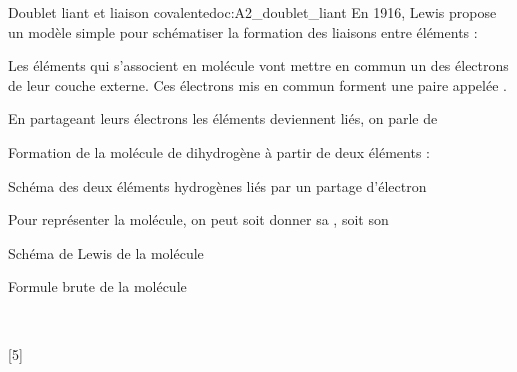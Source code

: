 \begin{doc}{Doublet liant et liaison covalente}{doc:A2_doublet_liant}
  En 1916, Lewis propose un modèle simple pour schématiser la formation des liaisons entre éléments :
  \begin{importants}  
    Les éléments qui s'associent en molécule vont mettre en commun un des électrons de leur couche externe.
    Ces électrons mis en commun forment une paire appelée .
  \end{importants}
  \begin{importants}  
    En partageant leurs électrons les éléments deviennent liés, on parle de 
  \end{importants}

  
  \exemple Formation de la molécule de dihydrogène  à partir de deux éléments  :
  
  \begin{center}
    {\small Schéma des deux éléments hydrogènes liés par un partage d'électron}
    \vspace{8pt}
    
  \end{center}

  Pour représenter la molécule, on peut soit donner sa , soit son 
  \begin{multicols}{2}
    \begin{center}
      {\small Schéma de Lewis de la molécule}
      
    \end{center}

    \begin{center}
      {\small Formule brute de la molécule}

      \
    \end{center}
  \end{multicols}
\end{doc}

[5]

